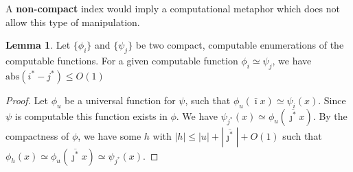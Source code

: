 \documentclass{article}
\theoremstyle{definition}
\newtheorem{lma}{Lemma}
\begin{document}
A \textbf{non-compact} index would imply a computational metaphor which does not allow this type of manipulation.

\begin{lma}
Let $\{\phi_i\}$ and $\{\psi_j\}$ be two compact, computable enumerations of the computable functions. For a given computable function $\phi_i \simeq \psi_j$,  we have $\mbox{abs}(i^* - j^*) \leq O(1)$ 
\end{lma}
\begin{proof}
Let $\phi_u$ be a universal function for $\psi$, such that $\phi_u(\bar{\imath}x) \simeq \psi_i(x)$. Since $\psi$ is computable this function exists in $\phi$. We have $\psi_{j^*}(x) \simeq \phi_u(\overline{\jmath^*}x)$. By the compactness of $\phi$, we have some $h$ with $|h| \leq |u| + |\overline{\jmath^*}| + O(1)$ such that $\phi_{h}(x) \simeq \phi_u(\overline{\jmath^*}x) \simeq \psi_{j^*}(x)$. 

\end{proof}
\end{document}
